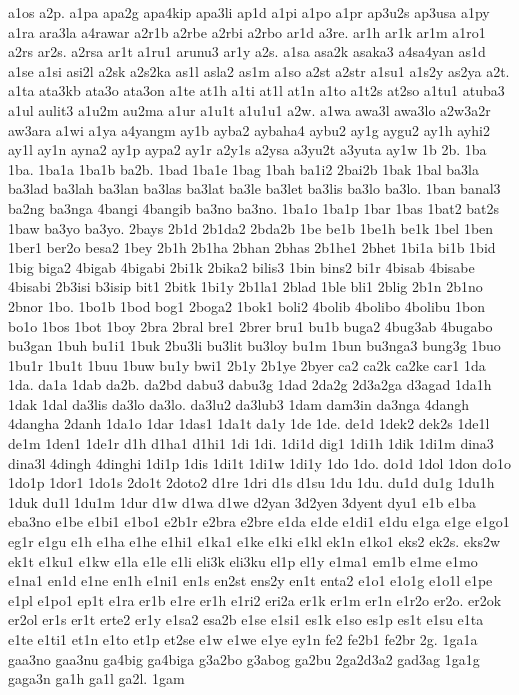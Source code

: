 {a1os
a2p.
a1pa
apa2g
apa4kip
apa3li
ap1d
a1pi
a1po
a1pr
ap3u2s
ap3usa
a1py
a1ra
ara3la
a4rawar
a2r1b
a2rbe
a2rbi
a2rbo
ar1d
a3re.
ar1h
ar1k
ar1m
a1ro1
a2rs
ar2s.
a2rsa
ar1t
a1ru1
arunu3
ar1y
a2s.
a1sa
asa2k
asaka3
a4sa4yan
as1d
a1se
a1si
asi2l
a2sk
a2s2ka
as1l
asla2
as1m
a1so
a2st
a2str
a1su1
a1s2y
as2ya
a2t.
a1ta
ata3kb
ata3o
ata3on
a1te
at1h
a1ti
at1l
at1n
a1to
a1t2s
at2so
a1tu1
atuba3
a1ul
aulit3
a1u2m
au2ma
a1ur
a1u1t
a1u1u1
a2w.
a1wa
awa3l
awa3lo
a2w3a2r
aw3ara
a1wi
a1ya
a4yangm
ay1b
ayba2
aybaha4
aybu2
ay1g
aygu2
ay1h
ayhi2
ay1l
ay1n
ayna2
ay1p
aypa2
ay1r
a2y1s
a2ysa
a3yu2t
a3yuta
ay1w
1b
2b.
1ba
1ba.
1ba1a
1ba1b
ba2b.
1bad
1ba1e
1bag
1bah
ba1i2
2bai2b
1bak
1bal
ba3la
ba3lad
ba3lah
ba3lan
ba3las
ba3lat
ba3le
ba3let
ba3lis
ba3lo
ba3lo.
1ban
banal3
ba2ng
ba3nga
4bangi
4bangib
ba3no
ba3no.
1ba1o
1ba1p
1bar
1bas
1bat2
bat2s
1baw
ba3yo
ba3yo.
2bays
2b1d
2b1da2
2bda2b
1be
be1b
1be1h
be1k
1bel
1ben
1ber1
ber2o
besa2
1bey
2b1h
2b1ha
2bhan
2bhas
2b1he1
2bhet
1bi1a
bi1b
1bid
1big
biga2
4bigab
4bigabi
2bi1k
2bika2
bilis3
1bin
bins2
bi1r
4bisab
4bisabe
4bisabi
2b3isi
b3isip
bit1
2bitk
1bi1y
2b1la1
2blad
1ble
bli1
2blig
2b1n
2b1no
2bnor
1bo.
1bo1b
1bod
bog1
2boga2
1bok1
boli2
4bolib
4bolibo
4bolibu
1bon
bo1o
1bos
1bot
1boy
2bra
2bral
bre1
2brer
bru1
bu1b
buga2
4bug3ab
4bugabo
bu3gan
1buh
bu1i1
1buk
2bu3li
bu3lit
bu3loy
bu1m
1bun
bu3nga3
bung3g
1buo
1bu1r
1bu1t
1buu
1buw
bu1y
bwi1
2b1y
2b1ye
2byer
ca2
ca2k
ca2ke
car1
1da
1da.
da1a
1dab
da2b.
da2bd
dabu3
dabu3g
1dad
2da2g
2d3a2ga
d3agad
1da1h
1dak
1dal
da3lis
da3lo
da3lo.
da3lu2
da3lub3
1dam
dam3in
da3nga
4dangh
4dangha
2danh
1da1o
1dar
1das1
1da1t
da1y
1de
1de.
de1d
1dek2
dek2s
1de1l
de1m
1den1
1de1r
d1h
d1ha1
d1hi1
1di
1di.
1di1d
dig1
1di1h
1dik
1di1m
dina3
dina3l
4dingh
4dinghi
1di1p
1dis
1di1t
1di1w
1di1y
1do
1do.
do1d
1dol
1don
do1o
1do1p
1dor1
1do1s
2do1t
2doto2
d1re
1dri
d1s
d1su
1du
1du.
du1d
du1g
1du1h
1duk
du1l
1du1m
1dur
d1w
d1wa
d1we
d2yan
3d2yen
3dyent
dyu1
e1b
e1ba
eba3no
e1be
e1bi1
e1bo1
e2b1r
e2bra
e2bre
e1da
e1de
e1di1
e1du
e1ga
e1ge
e1go1
eg1r
e1gu
e1h
e1ha
e1he
e1hi1
e1ka1
e1ke
e1ki
e1kl
ek1n
e1ko1
eks2
ek2s.
eks2w
ek1t
e1ku1
e1kw
e1la
e1le
e1li
eli3k
eli3ku
el1p
el1y
e1ma1
em1b
e1me
e1mo
e1na1
en1d
e1ne
en1h
e1ni1
en1s
en2st
ens2y
en1t
enta2
e1o1
e1o1g
e1o1l
e1pe
e1pl
e1po1
ep1t
e1ra
er1b
e1re
er1h
e1ri2
eri2a
er1k
er1m
er1n
e1r2o
er2o.
er2ok
er2ol
er1s
er1t
erte2
er1y
e1sa2
esa2b
e1se
e1si1
es1k
e1so
es1p
es1t
e1su
e1ta
e1te
e1ti1
et1n
e1to
et1p
et2se
e1w
e1we
e1ye
ey1n
fe2
fe2b1
fe2br
2g.
1ga1a
gaa3no
gaa3nu
ga4big
ga4biga
g3a2bo
g3abog
ga2bu
2ga2d3a2
gad3ag
1ga1g
gaga3n
ga1h
ga1l
ga2l.
1gam
}
